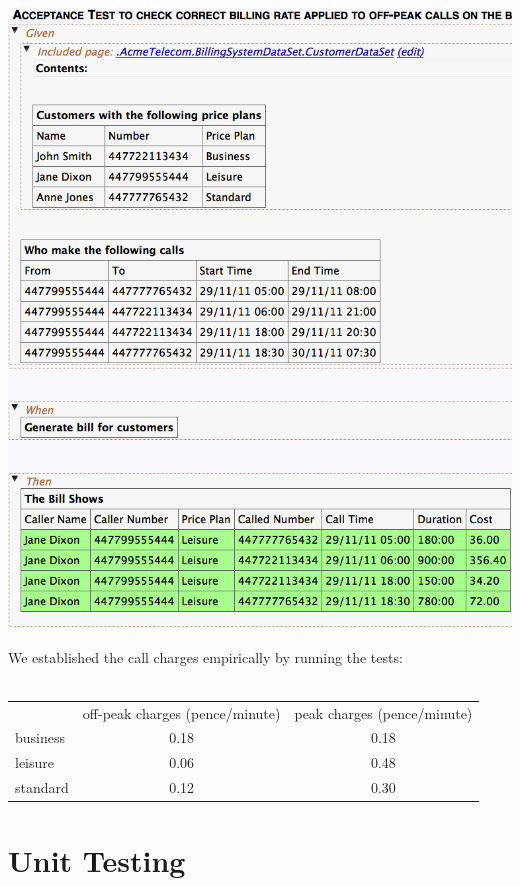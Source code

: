 \documentclass[a4paper,11pt]{article}
\begin{document}
\begin{center}
\includegraphics[scale=0.5]{images/fitnesse_test.png}
\end{center}

We established the call charges empirically by running the tests:
\\\\
\begin{tabular}{ l c c }
&				off-peak charges (pence/minute) &  peak charges (pence/minute) \\
business &		0.18&								0.18 \\
leisure & 			0.06& 								0.48 \\
standard & 		0.12&								0.30 \\
\end{tabular}

\pagebreak

\section{Unit Testing}
\end{document}
